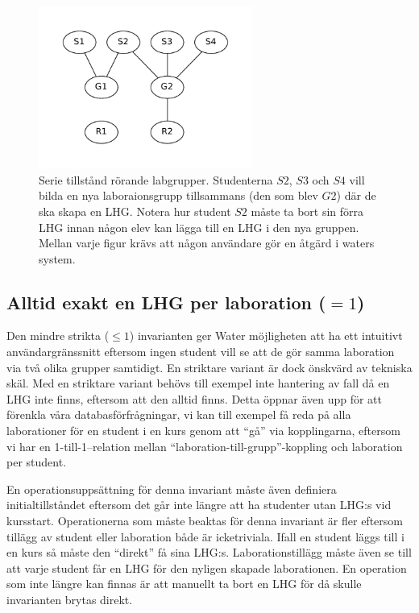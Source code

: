 \begin{figure}
  \includegraphics[width=7.0cm]{fig/labgroup/slack_add_5.pdf}        
  \caption[Serie tillstånd rörande labgrupper.]
  {Serie tillstånd rörande labgrupper. Studenterna $S2$, $S3$ och $S4$ vill
  bilda en nya laboraionsgrupp tillsammans (den som blev $G2$) där de ska skapa
  en LHG. Notera hur student $S2$ måste ta bort sin förra LHG innan någon elev
  kan lägga till en LHG i den nya gruppen. Mellan varje figur krävs att någon
  användare gör en åtgärd i waters system.}
  
\end{figure}

\subsection{Alltid exakt en LHG per laboration ($= 1$)}
Den mindre strikta ($\leq 1$) invarianten ger Water möjligheten att ha ett intuitivt användargränssnitt eftersom ingen student vill se att de gör samma laboration via två olika grupper samtidigt. En striktare variant är dock önskvärd av tekniska skäl. Med en striktare variant behövs till exempel inte hantering av fall då en LHG inte finns, eftersom att den alltid finns. Detta öppnar även upp för att förenkla våra databasförfrågningar, vi kan till exempel få reda på alla laborationer för en student i en kurs genom att “gå” via kopplingarna, eftersom vi har en 1-till-1–relation mellan “laboration-till-grupp”-koppling och laboration per student.

En operationsuppsättning för denna invariant måste även definiera initialtillståndet eftersom det går inte längre att ha studenter utan LHG:s vid kursstart. Operationerna som måste beaktas för denna invariant är fler eftersom tillägg av student eller laboration både är icketriviala. Ifall en student läggs till i en kurs så måste den “direkt” få sina LHG:s. Laborationstillägg måste även se till att varje student får en LHG för den nyligen skapade laborationen. En operation som inte längre kan finnas är att manuellt ta bort en LHG för då skulle invarianten brytas direkt.

